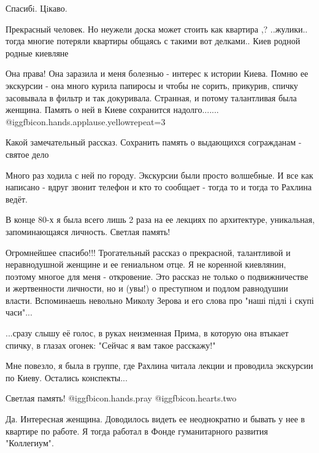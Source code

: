 \begin{itemize}
Спасибi. Цiкаво.


Прекрасный человек. Но неужели доска может стоить как квартира ,? ..жулики..
тогда многие потеряли квартиры общаясь с такими вот делками.. Киев родной родные
киевляне


Она права! Она заразила и меня болезнью - интерес к истории Киева. Помню ее
экскурсии - она много курила папиросы и чтобы не сорить, прикурив, спичку
засовывала в фильтр и так докуривала. Странная, и потому талантливая была
женщина. Память о ней в Киеве сохранится надолго....... @igg{fbicon.hands.applause.yellow}{repeat=3} 

Какой замечательный рассказ. Сохранить память о выдающихся согражданам - святое дело


Много раз ходила с ней по городу. Экскурсии были просто волшебные. И все как
написано - вдруг звонит телефон и кто то сообщает - тогда то и тогда то Рахлина
ведёт.


В конце 80-х я была всего лишь 2 раза на ее лекциях по архитектуре, уникальная,
запоминающаяся личность. Светлая память!


Огромнейшее спасибо!!! Трогательный рассказ о прекрасной, талантливой и неравнодушной женщине и ее гениальном отце.
Я не коренной киевлянин, поэтому многое для меня - откровение.
Это рассказ не только о подвижничестве и жертвенности личности, но и (увы!) о преступном и подлом равнодушии власти.
Вспоминаешь невольно Миколу Зерова и его слова про "наші підлі і скупі часи"...


...сразу слышу её голос, в руках неизменная Прима, в которую она втыкает
спичку, в глазах огонек: "Сейчас я вам такое расскажу!"

Мне повезло, я была в группе, где Рахлина читала лекции и проводила экскурсии
по Киеву. Остались конспекты...

Светлая память! @igg{fbicon.hands.pray}  @igg{fbicon.hearts.two} 


Да. Интересная женщина. Доводилось видеть ее неоднократно и бывать у нее в
квартире по работе. Я тогда работал в Фонде гуманитарного развития "Коллегиум".


\end{itemize}
